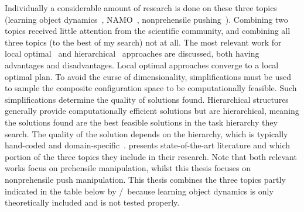 Individually a considerable amount of research is done on these three topics (learning object dynamics~\cite{cong_selfadapting_2020,seegmiller_vehicle_2013}, \ac{NAMO}~\cite{chen_fast_2018,elbanhawi_samplingbased_2014,ellis_navigation_2022,kingston_samplingbased_2018,lavalle_planning_2006,wang_affordancebased_2020}, nonprehensile pushing~\cite{arruda_uncertainty_2017,bauza_dataefficient_2018,mericli_pushmanipulation_2015,stuber_featurebased_2018,stuber_let_2020,toussaint_sequenceofconstraints_2022}). Combining two topics received little attention from the scientific community, and combining all three topics (to the best of my search) not at all. The most relevant work for local optimal~\cite{sabbaghnovin_model_2021} and hierarchical~\cite{scholz_navigation_2016} approaches are discussed, both having advantages and disadvantages. Local optimal approaches converge to a local optimal plan. To avoid the curse of dimensionality, simplifications must be used to sample the composite configuration space to be computationally feasible. Such simplifications determine the quality of solutions found. Hierarchical structures generally provide computationally efficient solutions but are hierarchical, meaning the solutions found are the best feasible solutions in the task hierarchy they search. The quality of the solution depends on the hierarchy, which is typically hand-coded and domain-specific~\cite{vega-brown_asymptotically_2020}.  presents state-of-the-art literature and which portion of the three topics they include in their research. Note that both relevant works focus on prehensile manipulation, whilst this thesis focuses on nonprehensile push manipulation. This thesis combines the three topics partly indicated in the table below by \xmark/\cmark~because learning object dynamics is only theoretically included and is not tested properly.\bs

